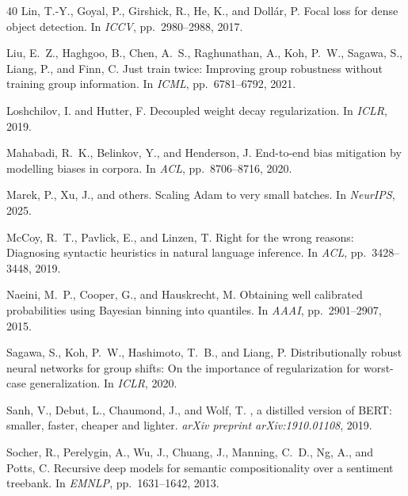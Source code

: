 \documentclass[10pt,twocolumn]{article}
\begin{document}
\begin{thebibliography}{40}
Lin, T.-Y., Goyal, P., Girshick, R., He, K., and Doll{\'a}r, P.
\newblock Focal loss for dense object detection.
\newblock In \emph{ICCV}, pp.\ 2980--2988, 2017.

Liu, E.~Z., Haghgoo, B., Chen, A.~S., Raghunathan, A., Koh, P.~W.,
  Sagawa, S., Liang, P., and Finn, C.
\newblock Just train twice: Improving group robustness without training
  group information.
\newblock In \emph{ICML}, pp.\ 6781--6792, 2021.

Loshchilov, I. and Hutter, F.
\newblock Decoupled weight decay regularization.
\newblock In \emph{ICLR}, 2019.

Mahabadi, R.~K., Belinkov, Y., and Henderson, J.
\newblock End-to-end bias mitigation by modelling biases in corpora.
\newblock In \emph{ACL}, pp.\ 8706--8716, 2020.

Marek, P., Xu, J., and others.
\newblock Scaling Adam to very small batches.
\newblock In \emph{NeurIPS}, 2025.

McCoy, R.~T., Pavlick, E., and Linzen, T.
\newblock Right for the wrong reasons: Diagnosing syntactic heuristics in
  natural language inference.
\newblock In \emph{ACL}, pp.\ 3428--3448, 2019.

Naeini, M.~P., Cooper, G., and Hauskrecht, M.
\newblock Obtaining well calibrated probabilities using {B}ayesian binning
  into quantiles.
\newblock In \emph{AAAI}, pp.\ 2901--2907, 2015.

Sagawa, S., Koh, P.~W., Hashimoto, T.~B., and Liang, P.
\newblock Distributionally robust neural networks for group shifts:
  On the importance of regularization for worst-case generalization.
\newblock In \emph{ICLR}, 2020.

Sanh, V., Debut, L., Chaumond, J., and Wolf, T.
, a distilled version of {BERT}: smaller, faster,
  cheaper and lighter.
\newblock \emph{arXiv preprint arXiv:1910.01108}, 2019.

Socher, R., Perelygin, A., Wu, J., Chuang, J., Manning, C.~D., Ng, A.,
  and Potts, C.
\newblock Recursive deep models for semantic compositionality over a
  sentiment treebank.
\newblock In \emph{EMNLP}, pp.\ 1631--1642, 2013.


\end{thebibliography}
\end{document}

